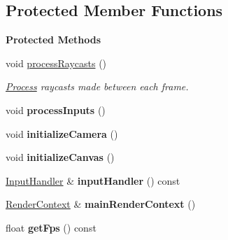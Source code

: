 \subsection*{Protected Member Functions}
\begin{Indent}\textbf{ Protected Methods}\par
\begin{DoxyCompactItemize}
\item 
\mbox{\label{classrev_1_1_debug_manager_a351e137f6e256aa31c464ab3fbcf9c03}} 
void \mbox{\hyperlink{classrev_1_1_debug_manager_a351e137f6e256aa31c464ab3fbcf9c03}{process\+Raycasts}} ()
\begin{DoxyCompactList}\small\item\em \mbox{\hyperlink{classrev_1_1_process}{Process}} raycasts made between each frame. \end{DoxyCompactList}\item 
\mbox{\label{classrev_1_1_debug_manager_a136436a40e38089d22441222628097d9}} 
void {\bfseries process\+Inputs} ()
\item 
\mbox{\label{classrev_1_1_debug_manager_a39d32e7fc30f3624d11b1d5651997d7e}} 
void {\bfseries initialize\+Camera} ()
\item 
\mbox{\label{classrev_1_1_debug_manager_ac3ff56893a0e07981046a4c120a944f6}} 
void {\bfseries initialize\+Canvas} ()
\item 
\mbox{\label{classrev_1_1_debug_manager_a13ae5b8f59248f3388ac02726b698ae2}} 
\mbox{\hyperlink{classrev_1_1_input_handler}{Input\+Handler}} \& {\bfseries input\+Handler} () const
\item 
\mbox{\label{classrev_1_1_debug_manager_a7ce1d617e9db0f885ab5ef6f4fe25ce2}} 
\mbox{\hyperlink{classrev_1_1_render_context}{Render\+Context}} \& {\bfseries main\+Render\+Context} ()
\item 
\mbox{\label{classrev_1_1_debug_manager_aea0df3670afc004b6a40a00d0e6fe8aa}} 
float {\bfseries get\+Fps} () const
\item 
\mbox{\label{classrev_1_1_debug_manager_aa2adc0e645b79d022278e3a4f7641ae3}} 

\end{DoxyCompactItemize}
\end{Indent}
